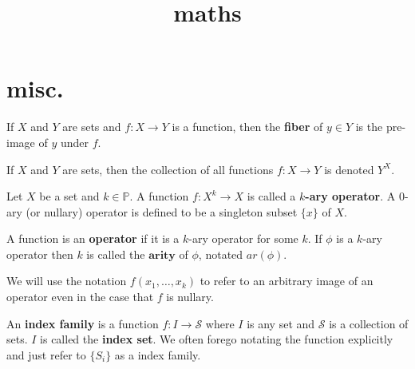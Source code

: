 

%


\title{maths}

\maketitle


\section{misc.}

\begin{definition}
\label{def-fiber}

If $X$ and $Y$ are sets and $f: X \rightarrow Y$ is a function, then the \textbf{fiber} of $y \in Y$ is the pre-image of $y$ under $f$.

\end{definition}


\begin{definition}
\label{def-collection-all-functions}

If $X$ and $Y$ are sets, then the collection of all functions $f: X \rightarrow Y$ is denoted $Y^X$.

\end{definition}

\begin{definition}
\label{def-k-ary-operator}

Let $X$ be a set and $k \in \mathbb{P}$. A function $f: X^k \rightarrow X$ is called a \textbf{$k$-ary operator}. A $0$-ary (or nullary) operator is defined to be a singleton subset $\{x\}$ of $X$.

A function is an \textbf{operator} if it is a $k$-ary operator for some $k$. If $\phi$ is a $k$-ary operator then $k$ is called the $\textbf{arity}$ of $\phi$, notated $ar(\phi)$.

We will use the notation $f(x_1, \ldots, x_k)$ to refer to an arbitrary image of an operator even in the case that $f$ is nullary.

\end{definition}


\begin{definition}
\label{def-indexed-family}

An \textbf{index family} is a function $f: I \rightarrow \mathcal{S}$ where $I$ is any set and $\mathcal{S}$ is a collection of sets. $I$ is called the \textbf{index set}. We often forego notating the function explicitly and just refer to $\{S_i\}$ as a index family.

\end{definition}


